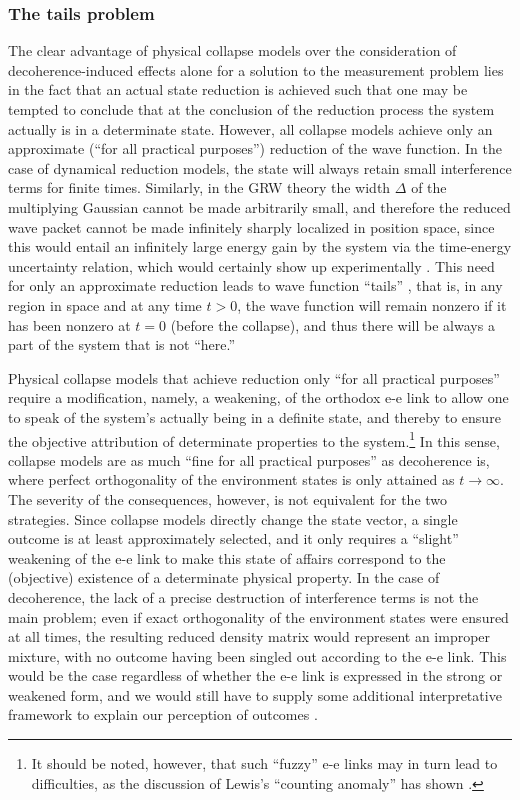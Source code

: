 \documentclass[twocolumn,rmp,aps,amsmath,amsfonts,noshowkeys,noshowpacs]{revtex4}
\begin{document}
\subsubsection{The tails problem}

The clear advantage of physical collapse models over the consideration
of decoherence-induced effects alone for a solution to the measurement
problem lies in the fact that an actual state reduction is achieved
such that one may be tempted to conclude that at the conclusion of the
reduction process the system actually is in a determinate state.
However, all collapse models achieve only an approximate (``for all
practical purposes'') reduction of the wave function.  In the case of
dynamical reduction models, the state will always retain small
interference terms for finite times.  Similarly, in the GRW theory the
width $\Delta$ of the multiplying Gaussian cannot be made arbitrarily
small, and therefore the reduced wave packet cannot be made infinitely
sharply localized in position space, since this would entail an
infinitely large energy gain by the system via the time-energy
uncertainty relation, which would certainly show up experimentally
\citetext{\citealp{Ghirardi:1986:ud}, chose $\Delta \approx
  10^{-5}~\text{cm}$}. This need for only an approximate reduction
leads to wave function ``tails'' \citep{Albert:1996:po}, that is, in
any region in space and at any time $t>0$, the wave function will
remain nonzero if it has been nonzero at $t=0$ (before the collapse),
and thus there will be always a part of the system that is not
``here.''

Physical collapse models that achieve reduction only ``for all
practical purposes'' require a modification, namely, a weakening, of
the orthodox {e-e} link to allow one to speak of the system's actually
being in a definite state, and thereby to ensure the objective
attribution of determinate properties to the system.\footnote{It
  should be noted, however, that such ``fuzzy'' {e-e} links may in
  turn lead to difficulties, as the discussion of Lewis's ``counting
  anomaly'' has shown \citep{Lewis:1997:ta}.} In this sense, collapse
models are as much ``fine for all practical purposes'' \citep[to
paraphrase][]{Bell:1990:po} as decoherence is, where perfect
orthogonality of the environment states is only attained as $t
\rightarrow \infty$.  The severity of the consequences, however, is
not equivalent for the two strategies. Since collapse models directly
change the state vector, a single outcome is at least approximately
selected, and it only requires a ``slight'' weakening of the {e-e}
link to make this state of affairs correspond to the (objective)
existence of a determinate physical property. In the case of
decoherence, the lack of a precise destruction of interference terms
is not the main problem; even if exact orthogonality of the
environment states were ensured at all times, the resulting reduced
density matrix would represent an improper mixture, with no outcome
having been singled out according to the {e-e} link. This would be the
case regardless of whether the {e-e} link is expressed in the strong
or weakened form, and we would still have to supply some additional
interpretative framework to explain our perception of outcomes
\citep[see also the comment by][]{Ghirardi:1987:po}.
\end{document}
